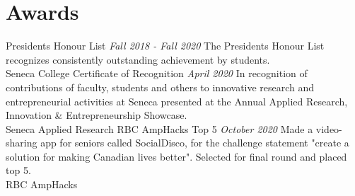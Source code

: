 \documentclass[letterpaper]{moderncv}
\begin{document}
\section{Awards}
\cventry
{}
{President\textquotesingle{}s Honour List}
{}
{\textit{Fall 2018 - Fall 2020}}
{}
{The President\textquotesingle{}s Honour List recognizes consistently outstanding achievement by students.\\Seneca College}
\vspace{1mm}
\cventry
{}
{Certificate of Recognition}
{}
{\textit{April 2020}}
{}
{In recognition of contributions of faculty, students and others to innovative research and entrepreneurial activities at Seneca presented at the Annual Applied Research, Innovation \& Entrepreneurship Showcase.\\Seneca Applied Research}
\vspace{1mm}
\cventry
{}
{RBC AmpHacks Top 5}
{}
{\textit{October 2020}}
{}
{Made a video-sharing app for seniors called SocialDisco, for the challenge statement "create a solution for making Canadian lives better". Selected for final round and placed top 5.\\RBC AmpHacks}
\vspace{1mm}
\ 
\end{document}

